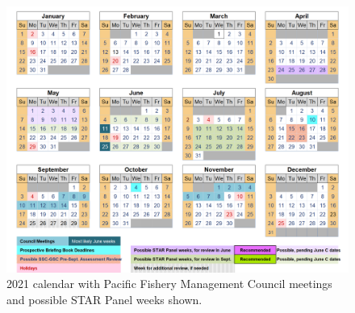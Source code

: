 \documentclass[11pt,
  english,
  a4paper,
]{article}
\begin{document}
\leavevmode\tagmcend\tagstructend


\begin{figure}
\centering
\includegraphics[width=1\textwidth,height=1\textheight]{figs/calendar.png}
\caption{2021 calendar with Pacific Fishery Management Council meetings and possible STAR Panel weeks shown.\label{fig:calendar}}
\end{figure}

\tagmcend\tagstructend
\end{document}
